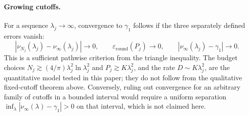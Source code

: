 \documentclass[11pt,a4paper]{article}
\begin{document}
\paragraph{Growing cutoffs.}
For a sequence $\lambda_j\to\infty$, convergence to $\gamma_1$ follows if the
three separately defined errors vanish:
\[
 |\nu_{N_j}(\lambda_j)-\nu_\infty(\lambda_j)|\to0,\qquad
 \varepsilon_{\mathrm{round}}(P_j)\to0,\qquad
 |\nu_\infty(\lambda_j)-\gamma_1|\to0.
\]
This is a sufficient pathwise criterion from the triangle inequality. The
budget choices
$N_j\gtrsim(4/\pi)\lambda_j^2\ln\lambda_j^2$ and
$P_j\gtrsim K\lambda_j^2$, and the rate
$D\sim K\lambda_j^2$, are the quantitative model tested in this paper; they do
not follow from the qualitative fixed-cutoff theorem above. Conversely, ruling
out convergence for an arbitrary family of cutoffs in a bounded interval would
require a uniform separation
$\inf_\lambda|\nu_\infty(\lambda)-\gamma_1|>0$ on that interval, which is not
claimed here.
\end{document}
